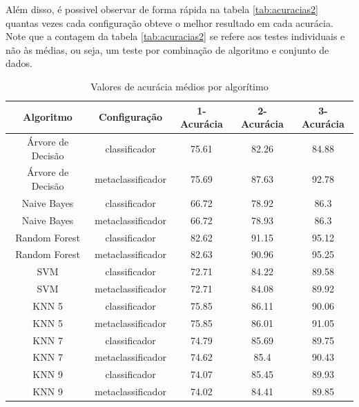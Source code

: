Além disso, é possivel observar de forma rápida na tabela \ref{tab:acuracias2} quantas vezes cada configuração obteve o melhor resultado em cada acurácia.
Note que a contagem da tabela \ref{tab:acuracias2} se refere aos testes individuais e não às médias, ou seja, um teste por combinação de algoritmo e conjunto de dados.


\begin{table}[h!]
  \begin{center}
    \begin{tabular}{ccccc}
      \hline
      \textbf{Algoritmo} & \textbf{Configuração} & \textbf{1-Acurácia} & \textbf{2-Acurácia} & \textbf{3-Acurácia}\\
      \hline

      Árvore de Decisão & classificador & 75.61 & 82.26 & 84.88\\
      Árvore de Decisão & metaclassificador & 75.69 & 87.63 & 92.78\\
      Naive Bayes & classificador & 66.72 & 78.92 & 86.3\\
      Naive Bayes & metaclassificador & 66.72 & 78.93 & 86.3\\
      Random Forest & classificador & 82.62 & 91.15 & 95.12\\
      Random Forest & metaclassificador & 82.63 & 90.96 & 95.25\\
      SVM & classificador & 72.71 & 84.22 & 89.58\\
      SVM & metaclassificador & 72.71 & 84.08 & 89.92\\
      KNN 5 & classificador & 75.85 & 86.11 & 90.06\\
      KNN 5 & metaclassificador & 75.85 & 86.01 & 91.05\\
      KNN 7 & classificador & 74.79 & 85.69 & 89.75\\
      KNN 7 & metaclassificador & 74.62 & 85.4 & 90.43\\
      KNN 9 & classificador & 74.07 & 85.45 & 89.93\\
      KNN 9 & metaclassificador & 74.02 & 84.41 & 89.85\\


      \hline
    \end{tabular}
    \caption{Valores de acurácia médios por algorítimo}
    \label{tab:acuracias}
  \end{center}
\end{table}

